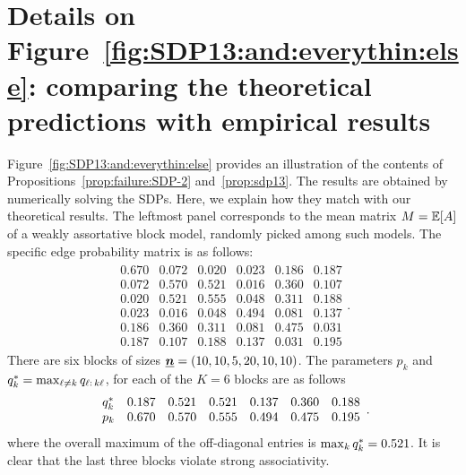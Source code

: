 











\section{Details on Figure~\ref{fig:SDP13:and:everythin:else}:  comparing the theoretical predictions with empirical results}
\label{sec:SDP13:fig:details}
Figure~\ref{fig:SDP13:and:everythin:else} provides an illustration of the contents of Propositions~\ref{prop:failure:SDP-2} and~\ref{prop:sdp13}. The results are obtained by numerically solving the SDPs. Here, we explain how they match with our theoretical results. The leftmost panel corresponds to the mean matrix $M = \mathbb{E}[A]$ of a weakly assortative block model, randomly picked among such models. The specific edge probability matrix is as follows: 
\begin{align*}
  \begin{array}{llllll}
    0.670 &   0.072 &  0.020 &   0.023 &   0.186 &  0.187 \\
    0.072 &   0.570 &  0.521 &   0.016 &   0.360 &  0.107 \\
    0.020 &   0.521 &  0.555 &   0.048 &   0.311 &  0.188 \\
    0.023 &   0.016 &  0.048 &   0.494 &   0.081 &  0.137 \\
    0.186 &   0.360 &  0.311 &   0.081 &   0.475 &  0.031 \\
    0.187 &   0.107 &  0.188 &   0.137 &   0.031 &  0.195
  \end{array}.
\end{align*}
There are six blocks of sizes ${\underline{\bm{n}}} = (10,10,5,20,10,10)$. The parameters $p_k$ and $ q^*_k = \max_{\ell \neq k} q_{\ell:\, k \ell}$, for each of the $K=6$ blocks are as follows
\begin{align}\label{eq:p:qs:table}
  \begin{array}{lllllll}
      q^*_k & 0.187 & 0.521 & 0.521 & 0.137 & 0.360 & 0.188  \\
      p_k & 0.670 & 0.570 & 0.555 & 0.494 & 0.475 & 0.195
  \end{array}.
\end{align}
where the overall maximum of the off-diagonal entries is $\max_k q^*_k = 0.521$. It is clear that the last three blocks violate strong associativity.

